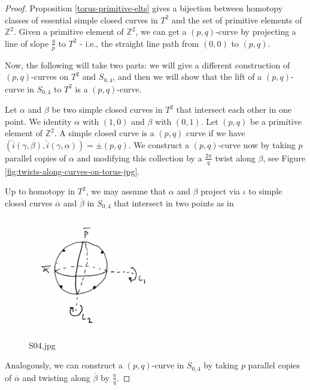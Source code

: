 \documentclass[reqno]{amsart}
\theoremstyle{definition}
\theoremstyle{remark}
\begin{document}
\begin{proof}
    Proposition \ref{torus-primitive-elts} gives
    a bijection between homotopy classes
    of essential simple closed curves in $T^2$ and the
    set of primitive elements of $\mathbb{Z}^2$.
    Given a primitive element of $\mathbb{Z}^2$, we can
    get a $\left( p,q \right) $-curve by projecting
    a line of slope $\frac{q}{p}$ to $T^2$ - i.e., the straight
    line path from $\left( 0,0 \right) $ to 
    $\left( p,q \right) $.

    Now, the following will take two
    parts: we will give a different construction of
    $\left( p,q \right) $-curves on $T^2$ and
    $S_{0,4}$, and then we will show that
    the lift of a $\left( p,q \right) $-curve in
    $S_{0,4}$ to $T^2$ is a $\left( p,q \right) $-curve.


    Let $\alpha$ and $\beta$ be two simple closed
    curves in $T^2$ that intersect each other in
    one point. We identity $\alpha$ with
    $\left( 1,0 \right) $ and $\beta$ with
    $\left( 0,1 \right) $. Let
    $\left( p,q \right) $ be a primitive element 
    of $\mathbb{Z}^2$. A simple closed curve is a
    $\left( p,q \right) $ curve if we have
    $\left( \hat{i}\left( \gamma,\beta \right) ,
    \hat{i} \left( \gamma,\alpha \right) \right) 
    = \pm \left( p,q \right) $. We
    construct a $\left( p,q \right) $-curve now by
    taking $p$ parallel copies of  $\alpha$ and
    modifying this collection by a
    $\frac{2\pi}{q}$ twist along $\beta$, see Figure
    \ref{fig:twists-along-curves-on-torus-jpg}.

    Up to homotopy in $T^2$, we may assume that
    $\alpha$ and $\beta$ project via $\iota$ to
    simple closed curves
    $\overline{\alpha}$ and $\overline{\beta}$ 
    in $S_{0,4}$ that intersect in two points as in
    
    \begin{figure}[H]
        \centering
        \includegraphics[width=0.5\textwidth]{S04.jpg}
        \caption{S04.jpg}
        \label{fig:S04-jpg}
    \end{figure}
    Analogously, we can construct a $\left( p,q \right) $-curve
    in $S_{0,4}$ by taking $p$ parallel copies of
    $\overline{\alpha}$ and twisting
    along $\overline{\beta}$ by
    $\frac{\pi}{q}$.


\end{proof}
\end{document}
